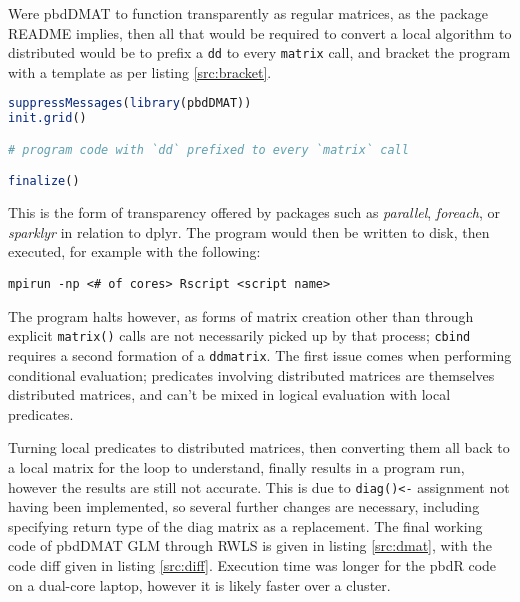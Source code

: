 \documentclass[a4paper,10pt]{article}
\begin{document}
Were pbdDMAT to function transparently as regular matrices, as the package
README implies, then all that would be required to convert a local algorithm to
distributed would be to prefix a \texttt{dd} to every \texttt{matrix} call, and
bracket the program with a template as per listing \ref{src:bracket}.
\begin{lstlisting}[float, language=R, frame=L,
caption={Idealised Common Wrap for Local to Distributed Matrices},
label=src:bracket]
suppressMessages(library(pbdDMAT))
init.grid()

# program code with `dd` prefixed to every `matrix` call

finalize()
\end{lstlisting}
This is the form of transparency offered by packages such as \textit{parallel},
\textit{foreach}, or \textit{sparklyr} in relation to dplyr.
The program would then be written to disk, then executed, for example with the
following:
\begin{lstlisting}
mpirun -np <# of cores> Rscript <script name>
\end{lstlisting}
The program halts however, as forms of matrix creation other than through
explicit \texttt{matrix()} calls are not necessarily picked up by that process;
\texttt{cbind} requires a second formation of a \texttt{ddmatrix}. The first
issue comes when performing conditional evaluation;
predicates involving distributed matrices are themselves distributed matrices,
and can't be mixed in logical evaluation with local predicates.

Turning local predicates to distributed matrices, then converting them all back
to a local matrix for the loop to understand, finally results in a program run,
however the results are still not accurate.  This is due to \texttt{diag()<-}
assignment not having been implemented, so several further changes are
necessary, including specifying return type of the diag matrix as a replacement.
The final working code of pbdDMAT GLM through RWLS is given in listing
\ref{src:dmat}, with the code diff given in listing \ref{src:diff}.
Execution time was longer for the pbdR code on a dual-core laptop, however it
is likely faster over a cluster. %




\end{document}

